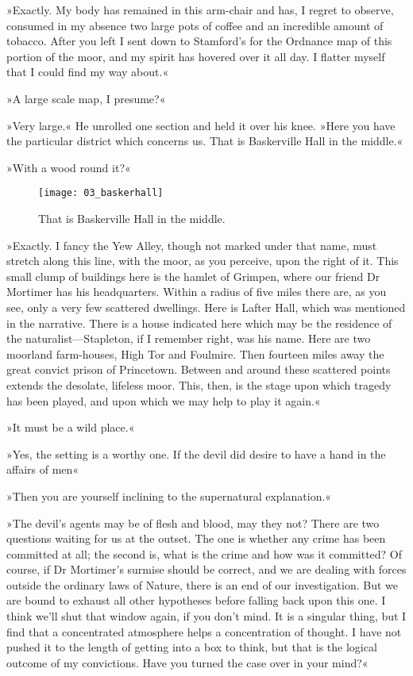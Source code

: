 »Exactly. My body has remained in this arm-chair and has, I regret to observe, consumed in my absence two large pots of coffee and an incredible amount of tobacco. After you left I sent down to Stamford's for the Ordnance map of this portion of the moor, and my spirit has hovered over it all day. I flatter myself that I could find my way about.«

»A large scale map, I presume?«

»Very large.« He unrolled one section and held it over his knee. »Here you have the particular district which concerns us. That is Baskerville Hall in the middle.«

»With a wood round it?«

\begin{figure}[tbhp]
\centering
\texttt{[image: 03\_baskerhall]}
\caption{That is Baskerville Hall in the middle.}
\end{figure}

»Exactly. I fancy the Yew Alley, though not marked under that name, must stretch along this line, with the moor, as you perceive, upon the right of it. This small clump of buildings here is the hamlet of Grimpen, where our friend Dr Mortimer has his headquarters. Within a radius of five miles there are, as you see, only a very few scattered dwellings. Here is Lafter Hall, which was mentioned in the narrative. There is a house indicated here which may be the residence of the naturalist—Stapleton, if I remember right, was his name. Here are two moorland farm-houses, High Tor and Foulmire. Then fourteen miles away the great convict prison of Princetown. Between and around these scattered points extends the desolate, lifeless moor. This, then, is the stage upon which tragedy has been played, and upon which we may help to play it again.«

»It must be a wild place.«

»Yes, the setting is a worthy one. If the devil did desire to have a hand in the affairs of men\longdash«

»Then you are yourself inclining to the supernatural explanation.«

»The devil's agents may be of flesh and blood, may they not? There are two questions waiting for us at the outset. The one is whether any crime has been committed at all; the second is, what is the crime and how was it committed? Of course, if Dr Mortimer's surmise should be correct, and we are dealing with forces outside the ordinary laws of Nature, there is an end of our investigation. But we are bound to exhaust all other hypotheses before falling back upon this one. I think we'll shut that window again, if you don't mind. It is a singular thing, but I find that a concentrated atmosphere helps a concentration of thought. I have not pushed it to the length of getting into a box to think, but that is the logical outcome of my convictions. Have you turned the case over in your mind?«

